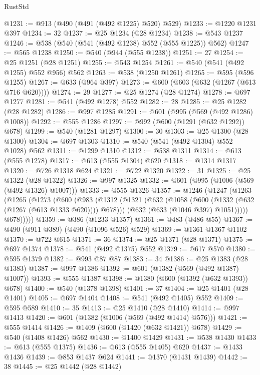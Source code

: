\begin{lexlean}{RustStd}
\begin{coremodule}
@1231 := @913 (@490 (@491 (@492 @1225) @520) @529)
@1233 := @1220 @1231 @397
@1234 := 32
@1237 := @25 @1234 (@28 @1234)
@1238 := @543 @1237
@1246 := @538 (@540 (@541 (@492 @1238) @552 (@555 @1225)) @562)
@1247 := @565 @1238
@1250 := @540 (@944 (@555 @1238))
@1251 := 27
@1254 := @25 @1251 (@28 @1251)
@1255 := @543 @1254
@1261 := @540 (@541 (@492 @1255) @552 @956) @562
@1263 := @538 (@1250 @1261)
@1265 := @595 (@596 @1255)
@1267 := @633 (@964 @397)
@1273 := @600 (@603 (@632 (@1267 (@613 @716 @620))))
@1274 := 29
@1277 := @25 @1274 (@28 @1274)
@1278 := @697 @1277
@1281 := @541 (@492 @1278) @552
@1282 := 28
@1285 := @25 @1282 (@28 @1282)
@1286 := @997 @1285
@1291 := @601 (@995 (@569 (@492 @1286) @1008))
@1292 := @555 @1286
@1297 := @992 (@600 (@1291 (@632 @1292)) @678)
@1299 := @540 (@1281 @1297)
@1300 := 30
@1303 := @25 @1300 (@28 @1300)
@1304 := @697 @1303
@1310 := @540 (@541 (@492 @1304) @552 @1028) @562
@1311 := @1299 @1310
@1312 := @538 @1311
@1314 := @613 (@555 @1278)
@1317 := @613 (@555 @1304) @620
@1318 := @1314 @1317
@1320 := @726 @1318 @624
@1321 := @722 @1320
@1322 := 31
@1325 := @25 @1322 (@28 @1322)
@1326 := @997 @1325
@1332 := @601 (@995 (@1006 (@569 (@492 @1326) @1007)))
@1333 := @555 @1326
@1357 := @1246
    (@1247
      (@1263
        (@1265
          (@1273
            (@600
              (@983
                (@1312
                  (@1321
                    (@632 (@1058 (@600 (@1332 (@632 (@1267 (@613 @1333 @620)))) @678)))
                    (@632 (@633 (@1046 @397) @1051)))))
              @678)))))
@1359 := @386 (@1233 @1357)
@1361 := @483 (@486 @55)
@1367 := @490 (@911 @389) (@490 (@1096 @526) @529)
@1369 := @1361 @1367 @1102
@1370 := @722 @615
@1371 := 36
@1374 := @25 @1371 (@28 @1371)
@1375 := @697 @1374
@1378 := @541 (@492 @1375) @552
@1379 := @617 @570
@1380 := @595 @1379
@1382 := @993 @87 @87
@1383 := 34
@1386 := @25 @1383 (@28 @1383)
@1387 := @997 @1386
@1392 := @601 (@1382 (@569 (@492 @1387) @1007))
@1393 := @555 @1387
@1398 := @1380 (@600 (@1392 (@632 @1393)) @678)
@1400 := @540 (@1378 @1398)
@1401 := 37
@1404 := @25 @1401 (@28 @1401)
@1405 := @697 @1404
@1408 := @541 (@492 @1405) @552
@1409 := @595 @589
@1410 := 35
@1413 := @25 @1410 (@28 @1410)
@1414 := @997 @1413
@1420 := @601 (@1382 (@1006 (@569 (@492 @1414) @576)))
@1421 := @555 @1414
@1426 := @1409 (@600 (@1420 (@632 @1421)) @678)
@1429 := @540 (@1408 @1426) @562
@1430 := @1400 @1429
@1431 := @538 @1430
@1433 := @613 (@555 @1375)
@1436 := @613 (@555 @1405) @620
@1437 := @1433 @1436
@1439 := @853 @1437 @624
@1441 := @1370 (@1431 @1439)
@1442 := 38
@1445 := @25 @1442 (@28 @1442)

\end{coremodule}
\end{lexlean}
